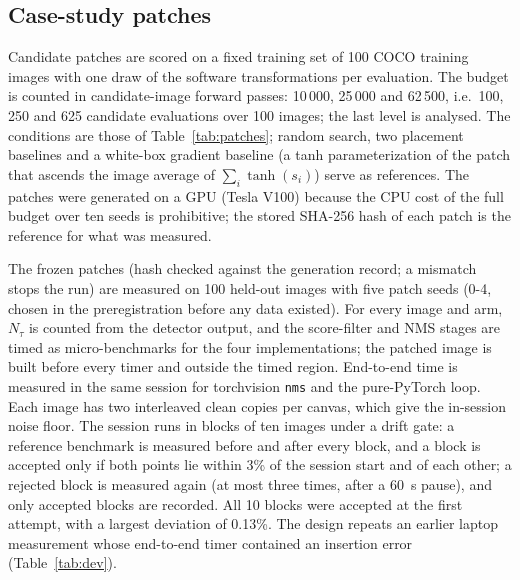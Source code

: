 \documentclass[a4paper,fleqn]{cas-dc}
\newcommand{\Ntau}{N_{\tau}}
\begin{document}
\subsection{Case-study patches}
\label{sec:attackdesign}
Candidate patches are scored on a fixed training set of 100 COCO training images \cite{lin2014coco} with one draw of the software transformations per evaluation. The budget is counted in candidate-image forward passes: 10\,000, 25\,000 and 62\,500, i.e.\ 100, 250 and 625 candidate evaluations over 100 images; the last level is analysed. The conditions are those of Table~\ref{tab:patches}; random search, two placement baselines and a white-box gradient baseline (a tanh parameterization of the patch that ascends the image average of $\sum_i \tanh(s_i)$) serve as references. The patches were generated on a GPU (Tesla V100) because the CPU cost of the full budget over ten seeds is prohibitive; the stored SHA-256 hash of each patch is the reference for what was measured.

The frozen patches (hash checked against the generation record; a mismatch stops the run) are measured on 100 held-out images with five patch seeds (0-4, chosen in the preregistration before any data existed). For every image and arm, $\Ntau$ is counted from the detector output, and the score-filter and NMS stages are timed as micro-benchmarks for the four implementations; the patched image is built before every timer and outside the timed region. End-to-end time is measured in the same session for torchvision \texttt{nms} and the pure-PyTorch loop. Each image has two interleaved clean copies per canvas, which give the in-session noise floor. The session runs in blocks of ten images under a drift gate: a reference benchmark is measured before and after every block, and a block is accepted only if both points lie within 3\% of the session start and of each other; a rejected block is measured again (at most three times, after a 60~s pause), and only accepted blocks are recorded. All 10 blocks were accepted at the first attempt, with a largest deviation of 0.13\%. The design repeats an earlier laptop measurement whose end-to-end timer contained an insertion error (Table~\ref{tab:dev}).
\end{document}
